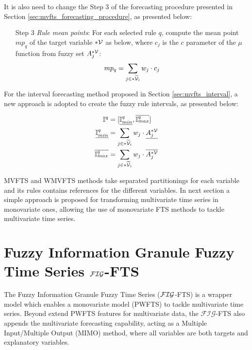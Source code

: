 It is also need to change the Step 3 of the forecasting procedure presented in Section \ref{sec:mvfts_forecasting_procedure}, as presented below:

\begin{enumerate}
    \item [Step 3] \textit{Rule mean points}: For each selected rule $q$, compute the mean point $mp_q$ of the target variable $*\mathcal{V}$ as below, where $c_j$ is the $c$ parameter of the $\mu$ function from fuzzy set $A_j^{*\mathcal{V}}$:
\begin{equation}
mp_q = \sum_{j \in *\widetilde{\mathcal{V}}_i} w_j \cdot c_j
\end{equation}
\end{enumerate}

For the interval forecasting method proposed in Section \ref{sec:mvfts_interval}, a new approach is adopted to create the fuzzy rule intervals, as presented below:

\begin{align}
    \mathbb{I}^q & =  [\underline{\mathbb{I}^q_{min}}, \overline{\mathbb{I}^q_{max}}] \\
    \underline{\mathbb{I}^q_{min}} &= \sum_{j \in *\widetilde{\mathcal{V}}_i} w_j \cdot \underline{A_j^{*\mathcal{V}}} \\
    \overline{\mathbb{I}^q_{max}} &= \sum_{j \in *\widetilde{\mathcal{V}}_i} w_j \cdot \overline{A_j^{*\mathcal{V}}} 
\end{align}

MVFTS and WMVFTS methods take separated partitionings for each variable and its rules contains references for the different variables.  In next section a simple approach is proposed for transforming multivariate time series in monovariate ones, allowing the use of monovariate FTS methods to tackle multivariate time series.

\section{Fuzzy Information Granule Fuzzy Time Series  $\mathcal{FIG}$-FTS}
\label{sec:fig_fts}

The Fuzzy Information Granule Fuzzy Time Series ($\mathcal{FIG}$-FTS) is a wrapper model which enables a monovariate model (PWFTS) to tackle multivariate time series. Beyond extend PWFTS features for multivariate data, the $\mathcal{FIG}$-FTS also appends the multivariate forecasting capability, acting as a Multiple Input/Multiple Output (MIMO) method, where all variables are both targets and explanatory variables. 

